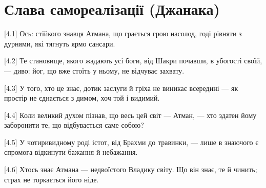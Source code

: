 \chapter[(Джанака)]{Слава самореалізації (Джанака)}

[4.1] Ось: стійкого знавця Атмана, що грається грою насолод, годі рівняти з дурнями, які тягнуть ярмо сансари.

[4.2] Те становище, якого жадають усі боги, від Шакри почавши, в убогості своїй, --- диво: йог, що вже стоїть у ньому, не відчуває захвату.

[4.3] У того, хто це знає, дотик заслуги й гріха не виникає всередині --- як простір не єднається з димом, хоч той і видимий.

[4.4] Коли великий духом пізнав, що весь цей світ --- Атман, --- хто здатен йому заборонити те, що відбувається саме собою?

[4.5] У чотиривидному роді істот, від Брахми до травинки, --- лише в знаючого є спромога відкинути бажання й небажання.

[4.6] Хтось знає Атмана --- недвоїстого Владику світу. Що він знає, те й чинить; страх не торкається його ніде.
